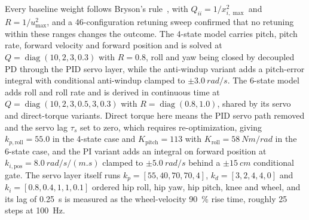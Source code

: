 \documentclass[a4paper,fleqn]{cas-dc}
\begin{document}
Every baseline weight follows Bryson's rule~\cite{bryson1975optimal}, with
$Q_{ii}{=}1/x_{i,\max}^{2}$ and $R{=}1/u_{\max}^{2}$, and a
\num{46}-configuration retuning sweep confirmed that no retuning within these
ranges changes the outcome. The 4-state model carries pitch, pitch rate, forward
velocity and forward position and is solved at
$Q{=}\operatorname{diag}(10,2,3,0.3)$ with $R{=}0.8$, roll and yaw being closed
by decoupled PD through the PID servo layer, while the anti-windup variant adds a
pitch-error integral with conditional anti-windup clamped to
$\pm\SI{3.0}{rad/s}$. The 6-state model adds roll and roll rate and is derived in
continuous time at $Q{=}\operatorname{diag}(10,2,3,0.5,3,0.3)$ with
$R{=}\operatorname{diag}(0.8,1.0)$, shared by its servo and direct-torque
variants. Direct torque here means the PID servo path removed and the servo lag
$\tau_s$ set to zero, which requires re-optimization, giving
$k_{p,\text{roll}}{=}55.0$ in the 4-state case and $K_{\text{pitch}}{=}113$ with
$K_{\text{roll}}{=}\SI{58}{Nm/rad}$ in the 6-state case, and the PI variant adds
an integral on forward position at $k_{i,\text{pos}}{=}\SI{8.0}{rad/s/(m.s)}$
clamped to $\pm\SI{5.0}{rad/s}$ behind a $\pm\SI{15}{cm}$ conditional gate. The
servo layer itself runs $k_p{=}[55,40,70,70,4]$, $k_d{=}[3,2,4,4,0]$ and
$k_i{=}[0.8,0.4,1,1,0.1]$ ordered hip roll, hip yaw, hip pitch, knee and wheel,
and its lag of \SI{0.25}{s} is measured as the wheel-velocity \SI{90}{\percent}
rise time, roughly \num{25} steps at \SI{100}{Hz}.
\end{document}
